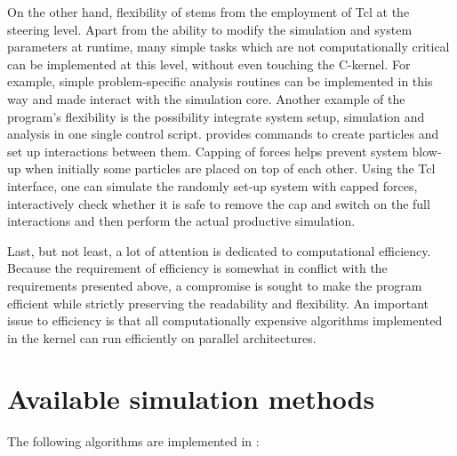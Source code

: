 On the other hand, flexibility of \es stems from the employment of Tcl
at the steering level. Apart from the ability to modify the simulation
and system parameters at runtime, many simple tasks which are not
computationally critical can be implemented at this level, without
even touching the C-kernel.  For example, simple problem-specific
analysis routines can be implemented in this way and made interact
with the simulation core.  Another example of the program's
flexibility is the possibility integrate system setup, simulation and
analysis in one single control script. \es provides commands to create
particles and set up interactions between them.  Capping of forces
helps prevent system blow-up when initially some particles are placed
on top of each other. Using the Tcl interface, one can simulate the
randomly set-up system with capped forces, interactively check whether
it is safe to remove the cap and switch on the full interactions and
then perform the actual productive simulation.

Last, but not least, a lot of attention is dedicated to computational
efficiency. Because the requirement of efficiency is somewhat in
conflict with the requirements presented above, a compromise is sought
to make the program efficient while strictly preserving the
readability and flexibility.  An important issue to efficiency is that
all computationally expensive algorithms implemented in the kernel can
run efficiently on parallel architectures.

\section{Available simulation methods}

The following algorithms are implemented in \es:


